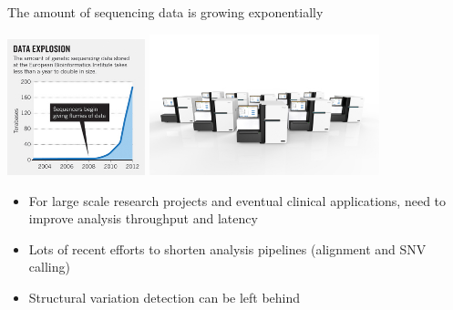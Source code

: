 \documentclass{beamer}
\begin{document}
\begin{frame}{The amount of sequencing data is growing exponentially}
\begin{center}
  \includegraphics[width=0.3\textwidth]{ebi_data_explosion.jpg}\hspace{1mm} 
  \includegraphics[width=0.5\textwidth]{HiSeqX_Ten_Image.jpg}
  
\end{center}
\begin{itemize}
  \item For large scale research projects and eventual clinical applications, need to improve analysis throughput and latency
  \item Lots of recent efforts to shorten analysis pipelines (alignment and SNV calling)
  \item Structural variation detection can be left behind
\end{itemize}
\end{frame}
\end{document}
